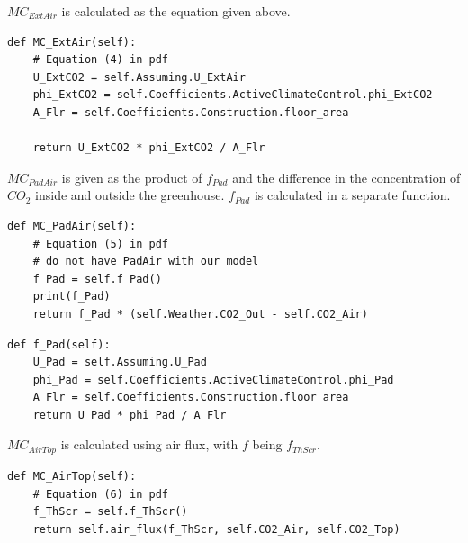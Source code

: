 \documentclass[a4paper]{article}
\begin{document}
\(MC_{ExtAir}\) is calculated as the equation given above.
\begin{mdframed}[leftline=false,rightline=false,backgroundcolor=magenta!10,nobreak=true]
  \begin{verbatim}
def MC_ExtAir(self):
    # Equation (4) in pdf
    U_ExtCO2 = self.Assuming.U_ExtAir
    phi_ExtCO2 = self.Coefficients.ActiveClimateControl.phi_ExtCO2
    A_Flr = self.Coefficients.Construction.floor_area

    return U_ExtCO2 * phi_ExtCO2 / A_Flr
  \end{verbatim}
\end{mdframed}

\(MC_{PadAir}\) is given as the product of \(f_{Pad}\) and the difference in the concentration of \(CO_2\) inside and outside the greenhouse.
\(f_{Pad}\) is calculated in a separate function.
\begin{mdframed}[leftline=false,rightline=false,backgroundcolor=magenta!10,nobreak=true]
  \begin{verbatim}
def MC_PadAir(self):
    # Equation (5) in pdf
    # do not have PadAir with our model
    f_Pad = self.f_Pad()
    print(f_Pad)
    return f_Pad * (self.Weather.CO2_Out - self.CO2_Air)
  \end{verbatim}
\end{mdframed}

\begin{mdframed}[leftline=false,rightline=false,backgroundcolor=magenta!10,nobreak=true]
  \begin{verbatim}
def f_Pad(self):
    U_Pad = self.Assuming.U_Pad
    phi_Pad = self.Coefficients.ActiveClimateControl.phi_Pad
    A_Flr = self.Coefficients.Construction.floor_area
    return U_Pad * phi_Pad / A_Flr
  \end{verbatim}
\end{mdframed}

\(MC_{AirTop}\) is calculated using air flux, with \(f\) being \(f_{ThScr}\).
\begin{mdframed}[leftline=false,rightline=false,backgroundcolor=magenta!10,nobreak=true]
  \begin{verbatim}
def MC_AirTop(self):
    # Equation (6) in pdf
    f_ThScr = self.f_ThScr()
    return self.air_flux(f_ThScr, self.CO2_Air, self.CO2_Top)
  \end{verbatim}
\end{mdframed}
\end{document}

